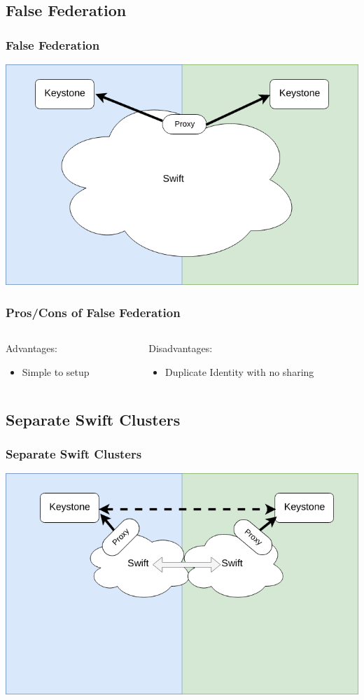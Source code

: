 \documentclass[aspectratio=169,11pt,hyperref={colorlinks=true}]{beamer}
\begin{document}
\subsection{False Federation}
\begin{frame}
\frametitle{False Federation}
\centering
\includegraphics[width=.775\textwidth]{swift-federation-false.png}
\end{frame}

\begin{frame}
\frametitle{Pros/Cons of False Federation}
\begin{columns}[T]
    \begin{column}{.48\textwidth}
        Advantages:
        \begin{itemize}
            \item Simple to setup
        \end{itemize}
    \end{column}
    \begin{column}{.48\textwidth}
        Disadvantages:
        \begin{itemize}
            \item Duplicate Identity with no sharing
        \end{itemize}
    \end{column}
\end{columns}
\end{frame}

\subsection{Separate Swift Clusters}
\begin{frame}
\frametitle{Separate Swift Clusters}
\centering
\includegraphics[width=.775\textwidth]{swift-federation-sep-container-sync.png}
\end{frame}
\end{document}
